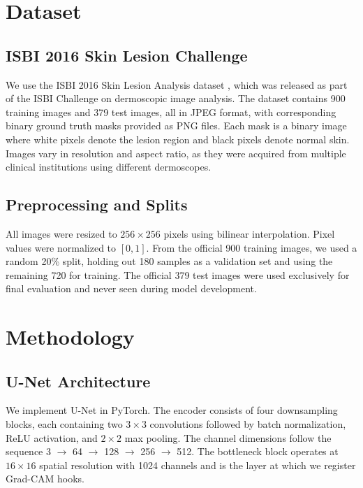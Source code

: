 \documentclass[10pt,journal,compsoc]{IEEEtran}
\begin{document}
\section{Dataset}

\subsection{ISBI 2016 Skin Lesion Challenge}
We use the ISBI 2016 Skin Lesion Analysis dataset \cite{isbi2016}, which was released as part of the ISBI Challenge on dermoscopic image analysis. The dataset contains 900 training images and 379 test images, all in JPEG format, with corresponding binary ground truth masks provided as PNG files. Each mask is a binary image where white pixels denote the lesion region and black pixels denote normal skin. Images vary in resolution and aspect ratio, as they were acquired from multiple clinical institutions using different dermoscopes.

\subsection{Preprocessing and Splits}
All images were resized to $256 \times 256$ pixels using bilinear interpolation. Pixel values were normalized to $[0, 1]$. From the official 900 training images, we used a random 20\% split, holding out 180 samples as a validation set and using the remaining 720 for training. The official 379 test images were used exclusively for final evaluation and never seen during model development.


\section{Methodology}

\subsection{U-Net Architecture}
We implement U-Net \cite{unet} in PyTorch. The encoder consists of four downsampling blocks, each containing two $3 \times 3$ convolutions followed by batch normalization, ReLU activation, and $2 \times 2$ max pooling. The channel dimensions follow the sequence 3 $\rightarrow$ 64 $\rightarrow$ 128 $\rightarrow$ 256 $\rightarrow$ 512. The bottleneck block operates at $16 \times 16$ spatial resolution with 1024 channels and is the layer at which we register Grad-CAM hooks.
\end{document}
